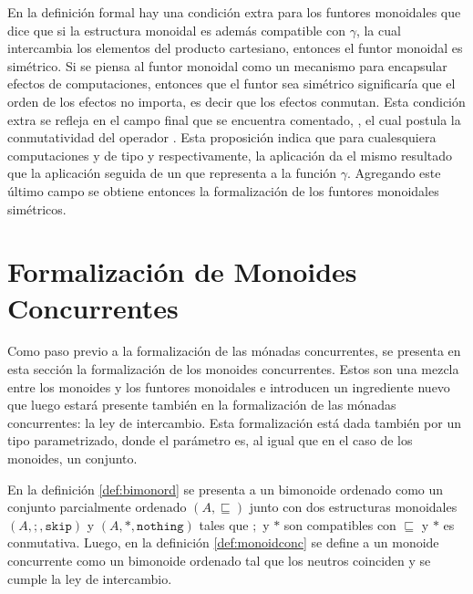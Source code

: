 En la definición formal hay una condición extra para los funtores monoidales que dice que si la estructura monoidal es además compatible con $\gamma$, la cual intercambia los elementos del producto cartesiano, entonces el funtor monoidal es simétrico. Si se piensa al funtor monoidal como un mecanismo para encapsular efectos de computaciones, entonces que el funtor sea simétrico significaría que el orden de los efectos no importa, es decir que los efectos conmutan. Esta condición extra se refleja en el campo final que se encuentra comentado, , el cual postula la conmutatividad del operador . Esta proposición indica que para cualesquiera computaciones  y  de tipo  y  respectivamente, la aplicación   da el mismo resultado que la aplicación   seguida de un  que representa a la función $\gamma$. Agregando este último campo se obtiene entonces la formalización de los funtores monoidales simétricos.

\section{Formalización de Monoides Concurrentes}\label{form:monoidconc}

Como paso previo a la formalización de las mónadas concurrentes, se presenta en esta sección la formalización de los monoides concurrentes. Estos son una mezcla entre los monoides y los funtores monoidales e introducen un ingrediente nuevo que luego estará presente también en la formalización de las mónadas concurrentes: la ley de intercambio. Esta formalización está dada también por un tipo  parametrizado, donde el parámetro es, al igual que en el caso de los monoides, un conjunto. 


En la definición \ref{def:bimonord} se presenta a un bimonoide ordenado como un conjunto parcialmente ordenado $(A,\sqsubseteq)$ junto con dos estructuras monoidales $(A,;,\mathtt{skip})$ y $(A,*,\mathtt{nothing})$ tales que $;$ y $*$ son compatibles con $\sqsubseteq$ y $*$ es conmutativa. Luego, en la definición \ref{def:monoidconc} se define a un monoide concurrente como un bimonoide ordenado tal que los neutros coinciden y se cumple la ley de intercambio.


